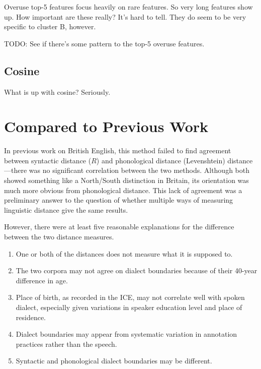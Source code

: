 Overuse top-5 features focus heavily on rare features. So very long
features show up. How important are these really? It's hard to
tell. They do seem to be very specific to cluster B, however.

TODO: See if there's some pattern to the top-5 overuse features.

\subsection{Cosine}

What is up with cosine? Seriously.

\section{Compared to Previous Work}

In previous work on British English, this method failed to find
agreement between syntactic distance ($R$) and phonological distance
(Levenshtein) distance---there was no
significant correlation between the two methods. Although both showed
something like a North/South distinction in Britain, its orientation was much more
obvious from phonological distance. This lack of agreement was a
preliminary answer to the question of whether multiple
ways of measuring linguistic distance give the same results.

However, there were at least five reasonable explanations for the difference
between the two distance measures.

\begin{enumerate}
\item One or both of the distances does not measure what it is supposed to.
\item The two corpora may not agree on dialect boundaries because of
  their 40-year difference in age.
\item Place of birth, as recorded in the ICE, may not correlate well
  with spoken dialect, especially given variations in speaker
  education level and place of residence.
\item Dialect boundaries may appear from systematic variation in
  annotation practices rather than the speech.
\item Syntactic and phonological dialect boundaries may be different.
\end{enumerate}

